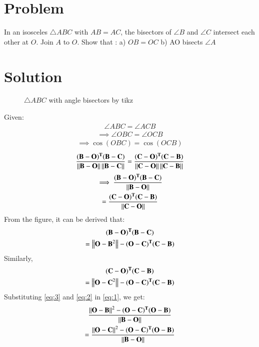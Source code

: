 \documentclass[journal,12pt,twocolumn]{IEEEtran}
\begin{document}
\section{Problem}
In an isosceles  $\triangle ABC$ with $AB = AC$, the
bisectors of $\angle B$ and $\angle C$ intersect each other at
$O$. Join $A$ to $O$. Show that :
a) $OB = OC$
b) AO bisects $\angle A$

\section{Solution}
\renewcommand{\thefigure}{1}
\begin{figure}[!ht]
\centering
\resizebox{\columnwidth}{!}{}
\caption{$\triangle ABC$ with angle bisectors by tikz}
\label{fig:perp_bisector}
\end{figure}
Given:
\begin{align}
    \angle ABC = \angle ACB
\end{align}
\begin{align}
    \implies \angle OBC = \angle OCB
\end{align}
\begin{align}
    \implies \cos (OBC) = \cos (OCB)
\end{align}
\begin{align}
   \frac{\mathbf{(B-O)^T}\mathbf{(B-C)}}{\left\lVert\mathbf{B-O}\right\rVert\left\lVert\mathbf{B-C}\right\rVert} = \frac{\mathbf{(C-O)^T}\mathbf{(C-B)}}{\left\lVert\mathbf{C-O}\right\rVert\left\lVert\mathbf{C-B}\right\rVert} 
\end{align}
\begin{multline}
    \implies\frac{\mathbf{(B-O)^T}\mathbf{(B-C)}}{\left\lVert\mathbf{B-O}\right\rVert} \\ =\frac{\mathbf{(C-O)^T}\mathbf{(C-B)}}{\left\lVert\mathbf{C-O}\right\rVert}\label{eq:1}
\end{multline}
From the figure, it can be derived that:
\begin{multline}
    \mathbf{(B-O)^T}\mathbf{(B-C)} \\ 
    =\left\lVert\mathbf{O-B}^2\right\rVert-\mathbf{(O-C)^T}\mathbf{(C-B)}\label{eq:2}
\end{multline}
Similarly,
\begin{multline}
    \mathbf{(C-O)^T}\mathbf{(C-B)} \\ 
    =\left\lVert\mathbf{O-C}^2\right\rVert-\mathbf{(O-C)^T}\mathbf{(C-B)} \label{eq:3}
\end{multline}
Substituting \eqref{eq:3} and \eqref{eq:2} in \eqref{eq:1}, we get:
\begin{multline}
    \frac{\left\lVert\mathbf{O-B}\right\rVert^2 - \mathbf{(O-C)^T(O-B)}}{\left\lVert\mathbf{B-O}\right\rVert} \\
    =\frac{\left\lVert\mathbf{O-C}\right\rVert^2 - \mathbf{(O-C)^T(O-B)}}{\left\lVert\mathbf{B-O}\right\rVert}
\end{multline}
\end{document}
